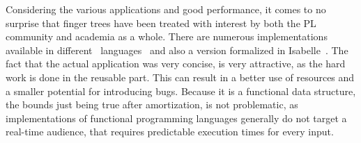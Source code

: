Considering the various applications and good performance, it comes to no surprise that finger trees have been treated with interest by both the PL community and academia as a whole. There are numerous implementations~\cite{Haskell} available in different~\cite{Scala} languages~\cite{OCaml} and also a version formalized in Isabelle~\cite{Finger-Trees-AFP}. The fact that the actual application was very concise, is very attractive, as the hard work is done in the reusable part. This can result in a better use of resources and a smaller potential for introducing bugs. Because it is a functional data structure, the bounds just being true after amortization, is not problematic, as implementations of functional programming languages generally do not target a real-time audience, that requires predictable execution times for every input.